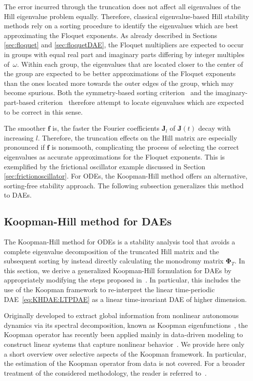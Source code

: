 \documentclass[a4paper, nonatbib, 3p, twocolumn]{elsarticle}
\theoremstyle{plain}
\theoremstyle{definition}
\theoremstyle{remark}
\newcommand{\mo}{\vPh_T}
\newcommand{\vPh}{\mathbf \Phi}
\newcommand{\vf}{\mathbf f}
\newcommand{\vJ}{\mathbf J}
\begin{document}
The error incurred through the truncation does not affect all eigenvalues of the Hill eigenvalue problem equally.
Therefore, classical eigenvalue-based Hill stability methods rely on a sorting procedure to identify the eigenvalues which are best approximating the Floquet exponents. As already described in Sections \ref{sec:floquet} and \ref{sec:floquetDAE}, the Floquet multipliers are expected to occur in groups with equal real part and imaginary parts differing by integer multiples of~$\omega$. Within each group, the eigenvalues that are located closer to the center of the group are expected to be better approximations of the Floquet exponents than the ones located more towards the outer edges of the group, which may become spurious. Both the symmetry-based sorting criterion~\cite{Guillot2020} and the imaginary-part-based criterion~\cite{Zhou2004} therefore attempt to locate eigenvalues which are expected to be correct in this sense.

The smoother $\vf$ is, the faster the Fourier coefficients $\vJ_l$ of $\vJ(t)$ decay with increasing $l$. Therefore, the truncation effects on the Hill matrix are especially pronounced if $\vf$ is nonsmooth, complicating the process of selecting the correct eigenvalues as accurate approximations for the Floquet exponents. This is exemplified by the frictional oscillator example discussed in Section \ref{sec:frictionoscillator}.
For ODEs, the
Koopman-Hill method offers an alternative, sorting-free stability approach. The following subsection generalizes this method to DAEs.

\subsection{Koopman-Hill method for DAEs}\label{ch:KHDAE:LiftedDynamics}
The Koopman-Hill method for ODEs \cite{Bayer2023,Bayer2024,Bayer2025} is a stability analysis tool that avoids a complete eigenvalue decomposition of the truncated Hill matrix and the subsequent sorting
by instead directly calculating the monodromy matrix $\mo$.
In this section, we derive a generalized Koopman-Hill formulation for DAEs by appropriately modifying the steps proposed in~\cite{Bayer2023}. In particular, this includes the use of the
Koopman framework \cite{Brunton2022} to re-interpret the linear time-periodic DAE~\eqref{eq:KHDAE:LTPDAE} as a linear time-invariant DAE of higher dimension. 

Originally developed to extract global information from nonlinear autonomous dynamics via its spectral decomposition, known as Koopman eigenfunctions~\cite{Koopman1931,Mauroy2016,Mauroy2020b}, the Koopman operator has recently been applied mainly in data-driven modeling to construct linear systems that capture nonlinear behavior~\cite{Brunton2022,Bruder2021,Budisic2012}. We provide here only a short overview over selective aspects of the Koopman framework. In particular, the estimation of the Koopman operator from data is not covered. For a broader treatment of the considered methodology, the reader is referred to~\cite{Mauroy2020a, Budisic2012}.
\end{document}

